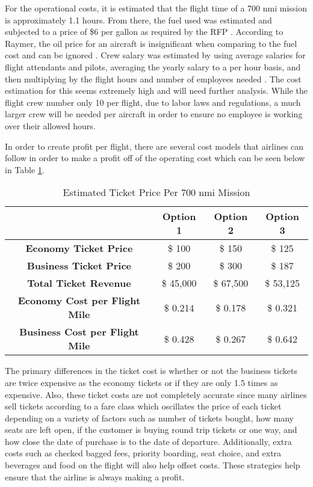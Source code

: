 For the operational costs, it is estimated that the flight time of a 700 nmi mission is approximately 1.1 hours. From there, the fuel used was estimated and subjected to a price of \$6 per gallon as required by the RFP \cite{RFP}. According to Raymer, the oil price for an aircraft is insignificant when comparing to the fuel cost and can be ignored \cite{raymer}. Crew salary was estimated by using average salaries for flight attendants and pilots, averaging the yearly salary to a per hour basis, and then multiplying by the flight hours and number of employees needed . The cost estimation for this seems extremely high and will need further analysis. While the flight crew number only 10 per flight, due to labor laws and regulations, a much larger crew will be needed per aircraft in order to ensure no employee is working over their allowed hours. 

In order to create profit per flight, there are several cost models that airlines can follow in order to make a profit off of the operating cost which can be seen below in Table \ref{tab:tickets}.

\begin{table}[!h]
    \centering
        \caption{Estimated Ticket Price Per 700 nmi Mission}
    \begin{tabular}{|c||c|c|c|}\toprule
         & \textbf{Option 1} & \textbf{Option 2} & \textbf{Option 3} \\\hline \hline
         \textbf{Economy Ticket Price} & \$ 100 & \$ 150 & \$ 125 \\ \hline
         \textbf{Business Ticket Price} & \$ 200 & \$ 300 & \$ 187  \\ \hline
         \textbf{Total Ticket Revenue} & \$ 45,000 & \$ 67,500 & \$ 53,125 \\ \hline
         \textbf{Economy Cost per Flight Mile} &  \$ 0.214 &  \$ 0.178 &  \$ 0.321 \\ \hline
         \textbf{Business Cost per Flight Mile} &  \$ 0.428 &  \$ 0.267 &  \$ 0.642 \\\bottomrule
    \end{tabular}
    \label{tab:tickets}
\end{table}

The primary differences in the ticket cost is whether or not the business tickets are twice expensive as the economy tickets or if they are only 1.5 times as expensive. Also, these ticket costs are not completely accurate since many airlines sell tickets according to a fare class which oscillates the price of each ticket depending on a variety of factors such as number of tickets bought, how many seats are left open, if the customer is buying round trip tickets or one way, and how close the date of purchase is to the date of departure. Additionally, extra costs such as checked bagged fees, priority boarding, seat choice, and extra beverages and food on the flight will also help offset costs. These strategies help ensure that the airline is always making a profit.

